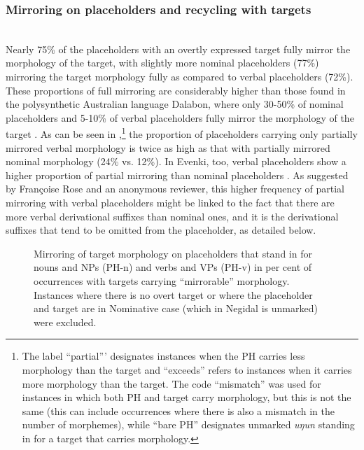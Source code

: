 \documentclass[output=paper]{langscibook}
\begin{document}
\subsubsection{Mirroring on placeholders and recycling with targets}
\label{sec:pakendorf:4.1.1.3}
~\\
Nearly 75\% of the placeholders with an overtly expressed target fully mirror the morphology of the target, with slightly more nominal placeholders (77\%) mirroring the target morphology fully as compared to verbal placeholders (72\%). These proportions of full mirroring are considerably higher than those found in the polysynthetic Australian language Dalabon, where only 30-50\% of nominal placeholders and 5-10\% of verbal placeholders fully mirror the morphology of the target \citep{chapters/ponsonnet}. As can be seen in ,\footnote{The label “partial”’ designates instances when the PH carries less morphology than the target and “exceeds” refers to instances when it carries more morphology than the target. The code “mismatch” was used for instances in which both PH and target carry morphology, but this is not the same (this can include occurrences where there is also a mismatch in the number of morphemes), while “bare PH” designates unmarked \textit{uŋun} standing in for a target that carries morphology.} the proportion of placeholders carrying only partially mirrored verbal morphology is twice as high as that with partially mirrored nominal morphology (24\% vs. 12\%). In Evenki, too, verbal placeholders show a higher proportion of partial mirroring than nominal placeholders \citep[211]{Klyachko2022}. As suggested by Françoise Rose and an anonymous reviewer, this higher frequency of partial mirroring with verbal placeholders might be linked to the fact that there are more verbal derivational suffixes than nominal ones, and it is the derivational suffixes that tend to be omitted from the placeholder, as detailed below.


\begin{figure}
\caption{Mirroring of target morphology on placeholders that stand in for nouns and NPs (PH-n) and verbs and VPs (PH-v) in per cent of occurrences with targets carrying “mirrorable” morphology. Instances where there is no overt target or where the placeholder and target are in Nominative case (which in Negidal is unmarked) were excluded.} 
\label{fig:pakendorf:11}
\end{figure}
\end{document}
